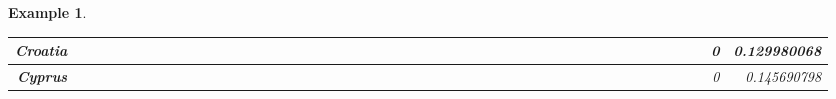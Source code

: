 \documentclass[a4paper,11pt]{report}
\newtheorem{example}[theorem]{Example}
\begin{document}
\begin{example}
\begin{appendices}
\begin{landscape}
\begin{longtable}{r|r|r|r|r|r|r|r|r|r|r|r|r|r|r|r|r|r|r|r|r|r|r|r|r|r|r|r|r|r|r|r|r|r|r|r|r|r|r|r|r|r|r|r|r|r|r|r|}
\multicolumn{1}{|r|}{\textbf{Croatia}}               &                  &                  &                  &                     &                  &                  &                                &                   &                  &                 &                  &                  &                           &                  &                 &                  &                  &                 &                  &                  &                  &                 &                &                 &                    &                &                  &                 &                 &                   &                  &                 &                     &                 &                   &                   &                &                 &                      &                          &                 &                  &                         &                 &                & 0                        & 0.129980068        \\ \hline
\multicolumn{1}{|r|}{\textbf{Cyprus}}                &                  &                  &                  &                     &                  &                  &                                &                   &                  &                 &                  &                  &                           &                  &                 &                  &                  &                 &                  &                  &                  &                 &                &                 &                    &                &                  &                 &                 &                   &                  &                 &                     &                 &                   &                   &                &                 &                      &                          &                 &                  &                         &                 &                & 0                        & 0.145690798        \\ \hline

\end{longtable}
\end{landscape}
\end{appendices}
\end{example}
\end{document}
